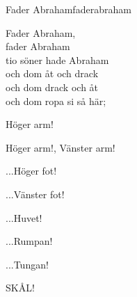 \begin{song}{Fader Abraham}{faderabraham}
\begin{vers}
Fader Abraham,\\
fader Abraham\\
tio söner hade Abraham\\
och dom åt och drack\\
och dom drack och åt\\
och dom ropa si så här;\\
\end{vers}
\begin{vers}
Höger arm!
\end{vers}
\begin{vers}
Höger arm!, Vänster arm!
\end{vers}
\begin{vers}
...Höger fot!
\end{vers}
\begin{vers}
...Vänster fot!
\end{vers}
\begin{vers}
...Huvet!
\end{vers}
\begin{vers}
...Rumpan!
\end{vers}
\begin{vers}
...Tungan!
\end{vers}
\begin{vers}
SKÅL!
\end{vers}
\end{song}
